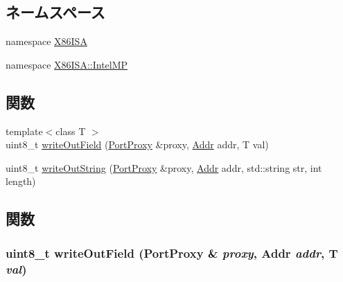 \subsection*{ネームスペース}
\begin{DoxyCompactItemize}
\item 
namespace \hyperlink{namespaceX86ISA}{X86ISA}
\item 
namespace \hyperlink{namespaceX86ISA_1_1IntelMP}{X86ISA::IntelMP}
\end{DoxyCompactItemize}
\subsection*{関数}
\begin{DoxyCompactItemize}
\item 
{\footnotesize template$<$class T $>$ }\\uint8\_\-t \hyperlink{intelmp_8hh_ab3e94577548c6c5fe3f19157088c400c}{writeOutField} (\hyperlink{classPortProxy}{PortProxy} \&proxy, \hyperlink{base_2types_8hh_af1bb03d6a4ee096394a6749f0a169232}{Addr} addr, T val)
\item 
uint8\_\-t \hyperlink{intelmp_8hh_a93b3fdf88faeff3328c156461d346a7a}{writeOutString} (\hyperlink{classPortProxy}{PortProxy} \&proxy, \hyperlink{base_2types_8hh_af1bb03d6a4ee096394a6749f0a169232}{Addr} addr, std::string str, int length)
\end{DoxyCompactItemize}


\subsection{関数}
\hypertarget{intelmp_8hh_ab3e94577548c6c5fe3f19157088c400c}{
\subsubsection[{writeOutField}]{\setlength{\rightskip}{0pt plus 5cm}uint8\_\-t writeOutField ({\bf PortProxy} \& {\em proxy}, \/  {\bf Addr} {\em addr}, \/  T {\em val})}}
\label{intelmp_8hh_ab3e94577548c6c5fe3f19157088c400c}



